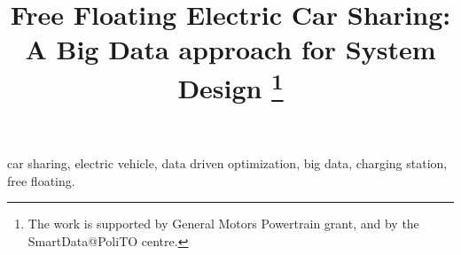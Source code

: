 \documentclass[conference]{IEEEtran}
\begin{document}
\title{Free Floating Electric Car Sharing:\\A Big Data approach for System Design
%
%
\thanks{The work is supported by General Motors Powertrain grant, and by the SmartData@PoliTO centre.}
}

\author{
\and
{}
\and
{}
\and
}

\maketitle




\begin{IEEEkeywords}
car sharing, electric vehicle, data driven optimization, big data, charging station, free floating.
\end{IEEEkeywords}









 







\end{document}
